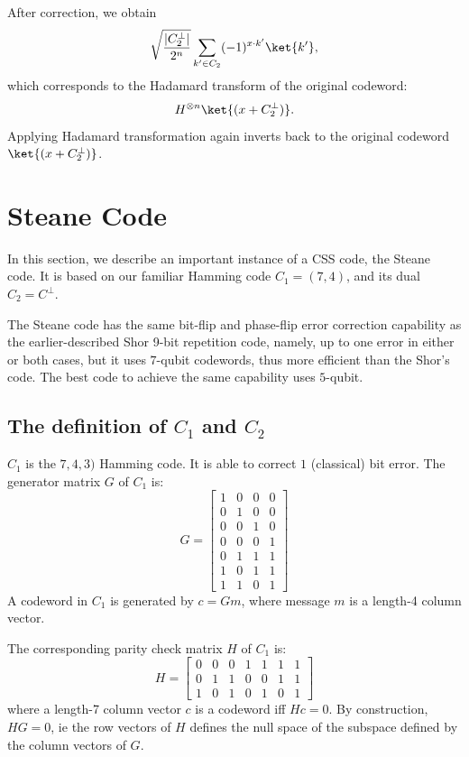 After correction, we obtain
\begin{align*}
\sqrt{\frac{|C_2^{\perp}|}{2^n}}\sum_{k'\in C_2}(-1)^{x\cdot k'} \ket{k'}, 
\end{align*}
which corresponds to the Hadamard transform of the original codeword: \[H^{\otimes n} \ket{(x + C_2^{\perp})}.\]
Applying Hadamard transformation again inverts back to the original codeword \(\ket{(x + C_2^{\perp})}\). 

\section{Steane Code}
In this section, we describe an important instance of a CSS code, the Steane code. It is based on our familiar Hamming code \(C_1 = (7, 4)\), and its dual \(C_2 = C^{\perp}\). 


The Steane code has the same bit-flip and phase-flip error correction capability as the earlier-described Shor 9-bit repetition code, namely, up to one error in either or both cases, but it uses \(7\)-qubit codewords, thus more efficient than the Shor's code. The best code to achieve the same capability uses \(5\)-qubit. 

\subsection{The definition of \(C_1\) and \(C_2\)}

\(C_1\) is the \(7,4,3)\) Hamming code. It is able to correct \(1\) (classical) bit error. The generator matrix \(G\) of \(C_1\) is: 
$$G = \begin{bmatrix}
    1 & 0 & 0 & 0\\
    0 & 1 & 0 & 0\\
    0 & 0 & 1 & 0\\
    0 & 0 & 0 & 1\\
    0 & 1 & 1 & 1\\
    1 & 0 & 1 & 1\\
    1 & 1 & 0 & 1
\end{bmatrix}$$
A codeword in \(C_1\) is generated by \(c = Gm\), where message \(m\) is a length-4 column vector.

The corresponding parity check matrix \(H\) of \(C_1\) is:  
$$H = \begin{bmatrix}
    0 & 0 & 0 & 1 & 1 & 1 & 1\\
    0 & 1 & 1 & 0 & 0 & 1 & 1\\
    1 & 0 & 1 & 0 & 1 & 0 & 1
\end{bmatrix}$$
where a length-7 column vector \(c\) is a codeword iff \(Hc= 0.\) By construction, \(HG=0\), ie the row vectors of \(H\) defines the null space of the subspace defined by the column vectors of \(G\).


